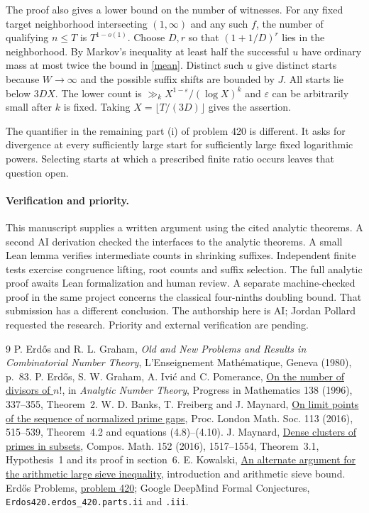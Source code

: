 \documentclass[10pt]{article}
\newcommand{\eps}{\varepsilon}
\begin{document}
The proof also gives a lower bound on the number of witnesses. For any fixed target neighborhood intersecting $(1,\infty)$ and any such $f$, the number of qualifying $n\le T$ is $T^{1-o(1)}$. Choose $D,r$ so that $(1+1/D)^r$ lies in the neighborhood. By Markov's inequality at least half the successful $u$ have ordinary mass at most twice the bound in \eqref{mean}. Distinct such $u$ give distinct starts because $W\to\infty$ and the possible suffix shifts are bounded by $J$. All starts lie below $3DX$. The lower count is $\gg_k X^{1-\eps}/(\log X)^k$ and $\eps$ can be arbitrarily small after $k$ is fixed. Taking $X=\lfloor T/(3D)\rfloor$ gives the assertion.

The quantifier in the remaining part (i) of problem 420 is different. It asks for divergence at every sufficiently large start for sufficiently large fixed logarithmic powers. Selecting starts at which a prescribed finite ratio occurs leaves that question open.

\paragraph{Verification and priority.} This manuscript supplies a written argument using the cited analytic theorems. A second AI derivation checked the interfaces to the analytic theorems. A small Lean lemma verifies intermediate counts in shrinking suffixes. Independent finite tests exercise congruence lifting, root counts and suffix selection. The full analytic proof awaits Lean formalization and human review. A separate machine-checked proof in the same project concerns the classical four-ninths doubling bound. That submission has a different conclusion. The authorship here is AI; Jordan Pollard requested the research. Priority and external verification are pending.

\begin{thebibliography}{9}
 P. Erd\H os and R. L. Graham, \emph{Old and New Problems and Results in Combinatorial Number Theory}, L'Enseignement Math\'ematique, Geneva (1980), p.~83.
 P. Erd\H os, S. W. Graham, A. Ivi\'c and C. Pomerance, \href{https://math.dartmouth.edu/~carlp/factorial.pdf}{On the number of divisors of $n!$}, in \emph{Analytic Number Theory}, Progress in Mathematics 138 (1996), 337--355, Theorem~2.
 W. D. Banks, T. Freiberg and J. Maynard, \href{https://doi.org/10.1112/plms/pdw036}{On limit points of the sequence of normalized prime gaps}, Proc. London Math. Soc. 113 (2016), 515--539, Theorem~4.2 and equations (4.8)--(4.10).
 J. Maynard, \href{https://doi.org/10.1112/S0010437X16007296}{Dense clusters of primes in subsets}, Compos. Math. 152 (2016), 1517--1554, Theorem~3.1, Hypothesis~1 and its proof in section~6.
 E. Kowalski, \href{https://people.math.ethz.ch/~kowalski/dual-large-sieve.pdf}{An alternate argument for the arithmetic large sieve inequality}, introduction and arithmetic sieve bound.
 Erd\H os Problems, \href{https://www.erdosproblems.com/420}{problem 420}; Google DeepMind Formal Conjectures, \texttt{Erdos420.erdos\_420.parts.ii} and \texttt{.iii}.
\end{thebibliography}
\end{document}
